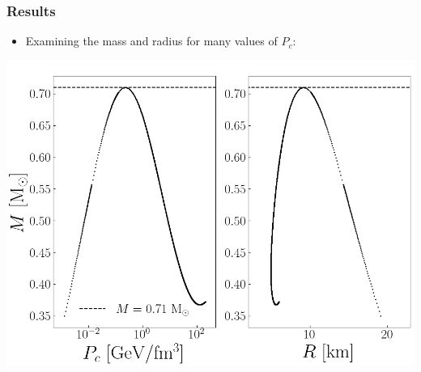 \documentclass{beamer}
\begin{document}
\begin{frame}
\frametitle{Results}
\begin{itemize}
    \item Examining the mass and radius for many values of $P_c$:
\end{itemize}
\begin{center}
    \includegraphics[scale=0.4]{TOV_limit.png}
\end{center}
\end{frame}
\end{document}

